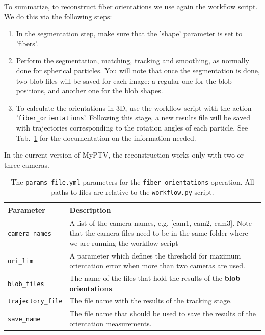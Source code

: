 \documentclass[10pt,a4paper]{article}
\begin{document}
To summarize, to reconstruct fiber orientations we use again the workflow script. We do this via the following steps:

\begin{enumerate}
	
	\item In the segmentation step, make sure that the 
	'shape' parameter is set to 'fibers'.
	
	\item Perform the segmentation, matching, tracking and smoothing, as normally done for spherical particles. You will note that once the segmentation is done, two blob files will be saved for each image: a regular one for the blob positions, and another one for the blob shapes. 
	
	\item To calculate the orientations in 3D, use the workflow script with the action '\texttt{fiber\_orientations}'. Following this stage, a new results file will be saved with trajectories corresponding to the rotation angles of each particle. See Tab.~\ref{tab:fibers} for the documentation on the information needed. 
	
\end{enumerate}  

In the current version of MyPTV, the reconstruction works only with two or three cameras.


%
\begin{table}[!ht]
	\centering
	\caption{The \texttt{params\_file.yml} parameters for the \texttt{fiber\_orientations} operation. All paths to files are relative to the \texttt{workflow.py} script. \label{tab:fibers}}
	\begin{tabular}{l m{12cm}}
		\hline
		Parameter & Description\\[.2cm]
		\hline
		\texttt{camera\_names} & A list of the camera names, e.g. [cam1, cam2, cam3]. Note that the camera files need to be in the same folder where we are running the workflow script\\[.2cm]
		\texttt{ori\_lim} & A parameter which defines the threshold for maximum orientation error when more than two cameras are used.\\[.2cm]
		\texttt{blob\_files} & The name of the files that hold the results of the \textbf{blob orientations}. \\[.2cm]
		\texttt{trajectory\_file} & The file name with the results of the tracking stage. \\[.2cm]
		\texttt{save\_name} & The file name that should be used to save the results of the orientation measurements. \\[.2cm]
		\hline
	\end{tabular}
\end{table}
\end{document}
